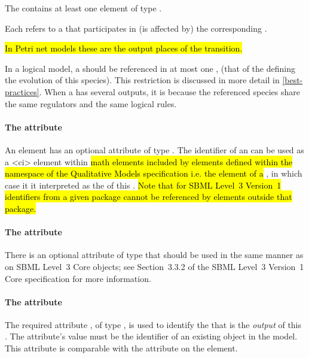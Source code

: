 The \ListOfOutputs contains at least one element of type \Output. 

Each \Output refers to a \QualitativeSpecies that participates in (is affected by) the corresponding \Transition. 

\hl{In Petri net models these are the output places of the transition.}

In a logical model, a \QualitativeSpecies should be referenced in at most one \ListOfOutputs, (that of the \Transition defining the evolution of this species). This restriction is discussed in more detail in \ref{best-practices}. When a \Transition has several outputs, it is because the referenced species share the same regulators and the same logical rules.




\paragraph{The  attribute}
An \Output element has an optional  attribute of type .  The identifier of an \Output can be used as a 
<ci> element within 
\hl{math elements included by elements defined within the namespace of the Qualitative Models specification i.e. the  element of a \FunctionTerm}, in which case it it interpreted as the  of this \Output. \hl{Note that for SBML Level~3 Version~1 identifiers from a given package cannot be referenced by elements outside that package. }

\paragraph{The  attribute}
There is an optional  attribute of type  that should be used
in the same manner as on SBML Level~3 Core
objects; see Section~3.3.2 of the SBML Level~3 Version~1 Core
specification for more information.



\paragraph{The  attribute}
The required attribute , of type , is used to identify the \QualitativeSpecies that is the \emph{output} of this \Transition.  The attribute's value must be the identifier of an existing \QualitativeSpecies object in the model.  This attribute is comparable with the  attribute on the  element.

